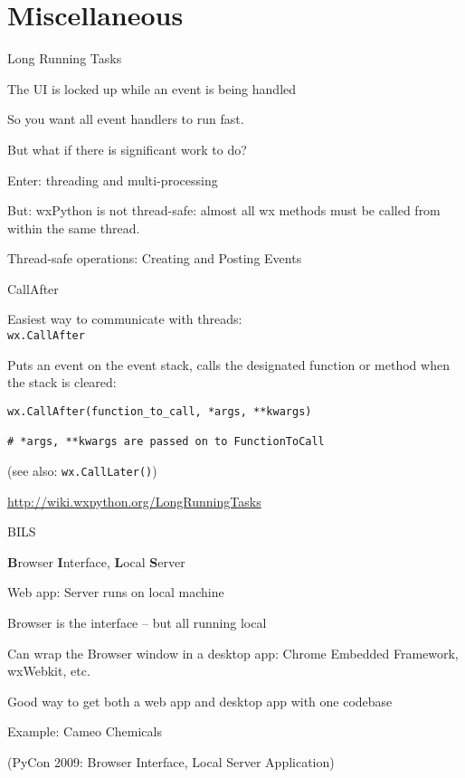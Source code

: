 \documentclass{beamer}
\begin{document}
\section{Miscellaneous}

\begin{frame}[fragile]{Long Running Tasks}

\vfill
{\Large The UI is locked up while an event is being handled}

\vfill
{\Large So you want all event handlers to run fast.}

\vfill
{\Large But what if there is significant work to do?}

\vfill
{\Large Enter: threading and multi-processing}

\vfill
{\Large But: wxPython is not thread-safe: almost all wx methods must be called from within the same thread.}

\vfill
{\Large Thread-safe operations: Creating and Posting Events}


\end{frame}


\begin{frame}[fragile]{CallAfter}

\vfill
{\Large Easiest way to communicate with threads:\\
 \verb`wx.CallAfter`}

\vfill
{\Large Puts an event on the event stack, calls the designated function or method when the stack is cleared:}

\begin{verbatim}
wx.CallAfter(function_to_call, *args, **kwargs)

# *args, **kwargs are passed on to FunctionToCall
\end{verbatim}

{\large (see also: \verb`wx.CallLater()`) }

\vfill
\url{http://wiki.wxpython.org/LongRunningTasks}

\end{frame}


\begin{frame}[fragile]{BILS}

\vfill
{\Large {\bf B}rowser {\bf I}nterface, {\bf L}ocal {\bf S}erver}
\vfill

\vfill
{\Large Web app: Server runs on local machine}
\vfill

\vfill
{\Large Browser is the interface -- but all running local}

\vfill
{\Large Can wrap the Browser window in a desktop app: Chrome Embedded Framework, wxWebkit, etc.}

\vfill
{\Large Good way to get both a web app and desktop app with one codebase}

\vfill
{\Large Example: Cameo Chemicals}

\vfill
(PyCon 2009: Browser Interface, Local Server Application)
\end{frame}
\end{document}

